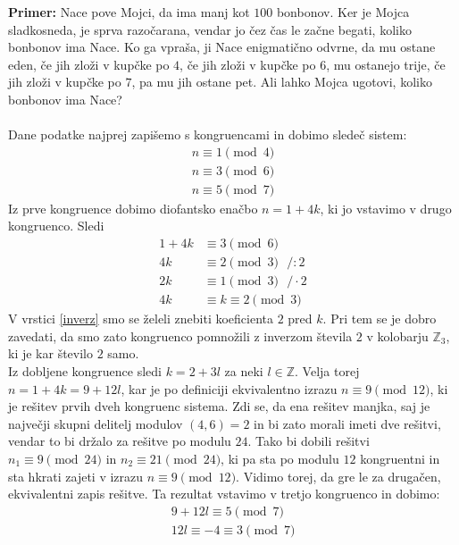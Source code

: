 \documentclass[12pt, a4paper]{article}
\newenvironment{prim}[1][]{\par\medskip\noindent \textbf{Primer: }}{\medskip}
\begin{document}
\begin{prim}
Nace pove Mojci, da ima manj kot $100$ bonbonov. Ker je Mojca sladkosneda, je sprva razočarana, vendar jo čez čas le začne begati, koliko bonbonov ima Nace. Ko ga vpraša, ji Nace enigmatično odvrne, da mu ostane eden, če jih zloži v kupčke po $4$, če jih zloži v kupčke po $6$, mu ostanejo trije, če jih zloži v kupčke po $7$, pa mu jih ostane pet. Ali lahko Mojca ugotovi, koliko bonbonov ima Nace? 
\\
\\
Dane podatke najprej zapišemo s kongruencami in dobimo sledeč sistem:
\begin{gather*}
n\equiv 1 \pmod 4 \\
n\equiv 3 \pmod 6 \\
n\equiv 5 \pmod 7
\end{gather*}
Iz prve kongruence dobimo diofantsko enačbo $n=1+4k$, ki jo vstavimo v drugo kongruenco. Sledi
\begin{align*}
1+4k&\equiv 3 \pmod 6 \\
4k&\equiv 2 \pmod 3 \ \ \ /:2 \\
2k&\equiv 1 \pmod 3 \ \ \  /\cdot 2 \tag{$\ast$}\label{inverz}\\
4k&\equiv k\equiv 2 \pmod 3
\end{align*}
V vrstici \eqref{inverz} smo se želeli znebiti koeficienta $2$ pred $k$. Pri tem se je dobro zavedati, da smo zato kongruenco pomnožili z inverzom števila $2$ v kolobarju $\mathbb{Z}_{3}$, ki je kar število $2$ samo. \\
Iz dobljene kongruence sledi $k=2+3l$ za neki $l\in \mathbb{Z}$. Velja torej $ n=1+4k=9+12l$, kar je po definiciji ekvivalentno izrazu $n\equiv9 \pmod{12}$, ki je rešitev prvih dveh kongruenc sistema. Zdi se, da ena rešitev manjka, saj je največji skupni delitelj modulov $(4,6)=2$ in bi zato morali imeti dve rešitvi, vendar to bi držalo za rešitve po modulu $24$. Tako bi dobili rešitvi $n_{1}\equiv 9 \pmod{24}$ in $n_{2}\equiv 21 \pmod{24}$, ki pa sta po modulu $12$ kongruentni in sta hkrati zajeti v izrazu $n\equiv9 \pmod{12}$. Vidimo torej, da gre le za drugačen, ekvivalentni zapis rešitve.
Ta rezultat vstavimo v tretjo kongruenco in dobimo:
\begin{gather*}
9+12l\equiv 5 \pmod 7 \\
12l\equiv -4 \equiv 3 \pmod 7 
\end{gather*}


\end{prim}
\end{document}
